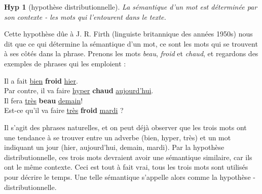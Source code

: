 \documentclass[11pt, a4paper]{report}
\newtheorem{hyp}{Hyp}[section]
\begin{document}
\begin{hyp}[hypothèse distributionnelle]
  La sémantique d'un mot est déterminée par son contexte - les mots qui l'entourent dans 
  le texte. 
\end{hyp}

Cette hypothèse dûe à J. R. Firth (linguiste britannique des années 1950s) nous dit que ce qui détermine la 
sémantique d'un mot, ce sont les mots qui se trouvent à ses côtés dans la phrase. Prenons les mots 
\textit{beau}, \textit{froid} et \textit{chaud}, et regardons des exemples de 
phrases qui les emploient : 

\begin{center}
  Il a fait \underline{bien} \textbf{froid} \underline{hier}. \\
  Par contre, il va faire \underline{hyper} \textbf{chaud} \underline{aujourd'hui}. \\
  Il fera \underline{très} \textbf{beau} \underline{demain}! \\
  Est-ce qu'il va faire \underline{très} \textbf{froid} \underline{mardi} ?
\end{center}

Il s'agit des phrases naturelles, et on peut déjà observer que les trois mots 
ont une tendance à se trouver entre un adverbe (bien, hyper, très) et un mot indiquant 
un jour (hier, aujourd'hui, demain, mardi). Par la hypothèse distributionnelle, ces trois mots 
devraient avoir une sémantique similaire, car ils ont le même 
contexte. Ceci est tout à fait vrai, tous les trois mots sont utilisés pour décrire le temps. 
Une telle sémantique s'appelle alors comme la hypothèse - distributionnelle. 
\end{document}

